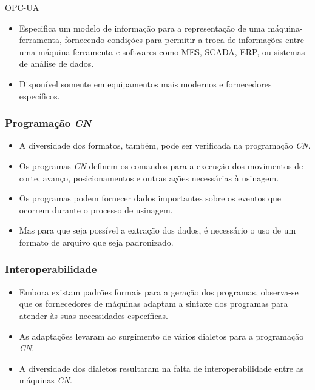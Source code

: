 \documentclass[aspectratio=169]{beamer}
\begin{document}
{\begin{frame}{OPC-UA}
\begin{itemize}
    \item {
      Especifica um modelo de informa\c c\~ao para a representa\c c\~ao 
      de uma m\'aquina-ferramenta, fornecendo condi\c c\~oes para permitir
      a troca de informa\c c\~oes entre uma m\'aquina-ferramenta e 
      softwares como MES, SCADA, ERP, ou sistemas de an\'alise de dados.
    }

    \item {
      Disponível somente em equipamentos mais modernos e fornecedores 
      específicos.
    }

  \end{itemize} 

\end{frame}


\begin{frame}
  \frametitle{Programação \emph{CN}}

\begin{itemize}
  \item A diversidade dos formatos, tamb\'em, pode ser verificada na 
        programa\c c\~ao \emph{CN}.
  \item Os programas \emph{CN} definem os comandos para a execução dos 
        movimentos de corte, avanço, posicionamentos e outras ações 
        necessárias à usinagem.
  \item Os programas podem fornecer dados importantes sobre os 
        eventos que ocorrem durante o processo de usinagem.
  \item Mas para que seja possível a extração dos dados, é necessário 
        o uso de um formato de arquivo que seja padronizado.
\end{itemize}  

\end{frame}


\begin{frame}
  \frametitle{Interoperabilidade}

  \begin{itemize}
    \item {
        Embora existam padr\~oes formais para a gera\c c\~ao dos 
        programas, observa-se que os fornecedores de m\'aquinas 
        adaptam a sintaxe dos programas para atender \`as suas 
        necessidades espec\'ificas.
    }

    \item {
      As adaptações levaram ao surgimento de vários dialetos 
      para a programação \emph{CN}.
    }
     
    \item {
      A diversidade dos dialetos resultaram na falta de interoperabilidade
      entre as máquinas \emph{CN}.
    }


\end{itemize}
\end{frame}}
\end{document}
